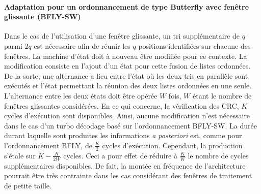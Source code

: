 \paragraph*{Adaptation pour un ordonnancement de type Butterfly avec fenêtre glissante (BFLY-SW)}
Dans le cas de l'utilisation d'une fenêtre glissante, %
un tri supplémentaire de $q$ parmi $2q$  est nécessaire afin de réunir les $q$ positions identifiées sur 
chacune des fenêtres. La machine d'état doit à nouveau être modifiée pour ce contexte. La modification consiste en 
l'ajout d'un état pour cette fusion de listes ordonnées. De la sorte, une alternance a lieu entre l'état où les deux tris en parallèle sont exécutés et l'état permettant la réunion des deux listes ordonnées en une seule. L'alternance entre les deux états doit être opérée $W$ fois, $W$ étant le nombre de fenêtres glissantes considérées.
En ce qui concerne, la vérification des CRC, $K$ cycles d'exécution sont disponibles. Ainsi, aucune modification n'est 
nécessaire dans le cas d'un turbo décodage basé sur l'ordonnancement BFLY-SW. La durée durant laquelle sont 
produites les informations \textit{a posteriori} est, comme pour 
l'ordonnancement BFLY, de $\frac{K}{2}$ cycles d'exécution. Cependant, la production s'étale sur $K-\frac{K}{2W}$ cycles. 
Ceci a pour effet de réduire à $\frac{K}{W}$ le nombre de cycles 
supplémentaires disponibles. De fait, la montée en fréquence de l'architecture pourrait être très contrainte dans les cas
considérant des fenêtres de traitement de petite taille.

